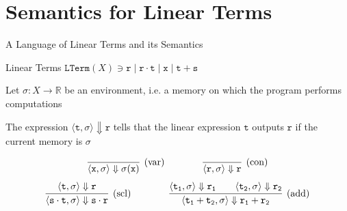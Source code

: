 \documentclass{beamer}
\begin{document}
\section{Semantics for Linear Terms}

\begin{frame}{A Language of Linear Terms and its Semantics}

        \begin{block}{Linear Terms}
	$\mathtt{LTerm}(X) \ni \mathtt{r} \mid \mathtt{r \cdot t}
        \mid \mathtt{x}  \mid \mathtt{t + s }$
	\end{block}

        Let $\sigma : X \to \mathbb{R}$ be an \alert{environment}, i.e. a
        memory on which the program performs computations

        The expression $\langle \mathtt{t},\sigma \rangle \Downarrow
        \mathtt{r}$ tells that the linear expression $\mathtt{t}$ outputs
        $\mathtt{r}$ if the current memory is $\sigma$

        \[
                \infer[(\text{var})]{\langle \mathtt{x}, \sigma \rangle 
                \Downarrow \sigma(\mathtt{x})}{} \qquad \qquad
                \infer[(\text{con})]{\langle \mathtt{r}, \sigma \rangle 
                \Downarrow \mathtt{r}}{}
        \] \vspace{0.1cm}        
        \[        
                \infer[(\text{scl})]{  
                        \langle \mathtt{s} \cdot \mathtt{t}, \sigma \rangle \Downarrow 
                        \mathtt{s \cdot r}
                        }{
                        \langle \mathtt{t}, \sigma \rangle \Downarrow \mathtt{r}
                } \qquad \qquad
                \infer[(\text{add})]{  
                        \langle \mathtt{t_1} + \mathtt{t_2}, \sigma \rangle \Downarrow 
                        \mathtt{r_1 + r_2}
                        }{
                        \langle \mathtt{t_1}, \sigma \rangle \Downarrow \mathtt{r_1} \qquad
                        \langle \mathtt{t_2}, \sigma \rangle \Downarrow \mathtt{r_2}
                }
        \]
\end{frame}        
\end{document}

